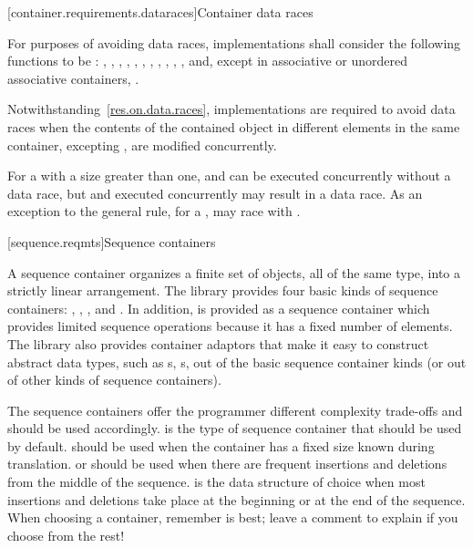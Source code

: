 [container.requirements.dataraces]{Container data races}

\pnum
For purposes of avoiding data races, implementations shall
consider the following functions to be : , ,
, , , , , ,
, , ,  and, except in
associative or unordered associative containers, .

\pnum
Notwithstanding~\ref{res.on.data.races}, implementations are required to avoid data
races when the contents of the contained object in different elements in the same
container, excepting , are modified concurrently.

\pnum
\begin{note} For a  with a size greater than one, 
and  can be executed concurrently without a data race, but
 and  executed concurrently may result in a data
race.
As an exception to the general rule, for a , 
may race with .
\end{note}

[sequence.reqmts]{Sequence containers}

\pnum
A sequence container organizes a finite set of objects, all of the same type, into a strictly
linear arrangement. The library provides four basic kinds of sequence containers:
, , , and . In addition,
 is provided as a sequence container which provides limited sequence operations
because it has a fixed number of elements. The library also provides container
adaptors that make it easy to construct abstract data types, such
as s, s, out of the basic sequence container kinds (or out of other kinds of sequence
containers).

\pnum
\begin{note}
The sequence containers
offer the programmer different complexity trade-offs and should be used
accordingly.
is the type of sequence container that should be used by default.
should be used when the container has a fixed size known during translation.
 or 
should be used when there are frequent insertions and deletions from the
middle of the sequence.
is the data structure of choice
when most insertions and deletions take place at the beginning or at the
end of the sequence.
When choosing a container, remember  is best;
leave a comment to explain if you choose from the rest!
\end{note}

